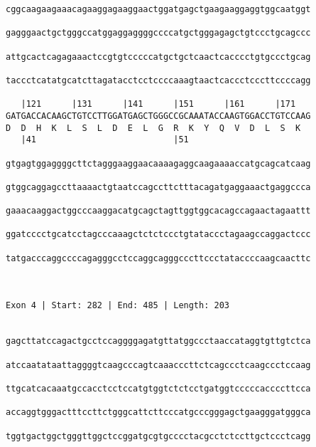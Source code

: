 \documentclass{article}
\begin{document}
\begin{Verbatim}
cggcaagaagaaacagaaggagaaggaactggatgagctgaagaaggaggtggcaatggt
                                                            
gagggaactgctgggccatggaggaggggccccatgctgggagagctgtccctgcagccc
                                                            
attgcactcagagaaactccgtgtcccccatgctgctcaactcacccctgtgccctgcag
                                                            
taccctcatatgcatcttagatacctcctccccaaagtaactcaccctcccttccccagg
                                                            
   |121      |131      |141      |151      |161      |171   
GATGACCACAAGCTGTCCTTGGATGAGCTGGGCCGCAAATACCAAGTGGACCTGTCCAAG
D  D  H  K  L  S  L  D  E  L  G  R  K  Y  Q  V  D  L  S  K  
   |41                           |51                        
  
gtgagtggaggggcttctagggaaggaacaaaagaggcaagaaaaccatgcagcatcaag
                                                            
gtggcaggagccttaaaactgtaatccagccttctttacagatgaggaaactgaggccca
                                                            
gaaacaaggactggcccaaggacatgcagctagttggtggcacagccagaactagaattt
                                                            
ggatcccctgcatcctagcccaaagctctctccctgtataccctagaagccaggactccc
                                                            
tatgacccaggccccagagggcctccaggcagggcccttccctataccccaagcaacttc
                                                            
                                                            
 
Exon 4 | Start: 282 | End: 485 | Length: 203


gagcttatccagactgcctccaggggagatgttatggccctaaccataggtgttgtctca
                                                            
atccaatataattaggggtcaagcccagtcaaacccttctcagccctcaagccctccaag
                                                            
ttgcatcacaaatgccacctcctccatgtggtctctcctgatggtcccccaccccttcca
                                                            
accaggtgggactttccttctgggcattcttcccatgcccgggagctgaagggatgggca
                                                            
tggtgactggctgggttggctccggatgcgtgcccctacgcctctccttgctccctcagg
                                                            

\end{Verbatim}
\end{document}
